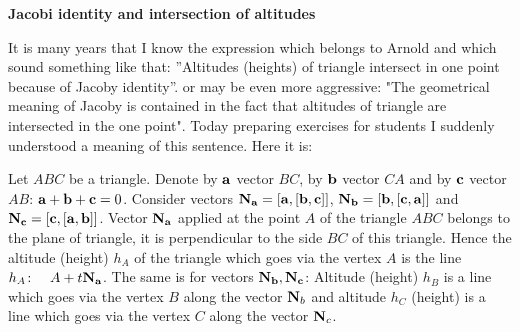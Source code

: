 \def\vare {\varepsilon}
\def\A {{\bf A}}
\def\t {\tilde}
\def\a {\alpha}
\def\K {{\bf K}}
\def\N {{\bf N}}
\def\V {{\cal V}}
\def\s {{\sigma}}
\def\S {{\Sigma}}
\def\s {{\sigma}}
\def\p{\partial}
\def\vare{{\varepsilon}}
\def\Q {{\bf Q}}
\def\D {{\cal D}}
\def\G {{\Gamma}}
\def\C {{\bf C}}
\def\M {{\cal M}}
\def\Z {{\bf Z}}
\def\U  {{\cal U}}
\def\H {{\cal H}}
\def\R  {{\bf R}}
\def\E  {{\bf E}}
\def\l {\lambda}
\def\degree {{\bf {\rm degree}\,\,}}
\def \finish {${\,\,\vrule height1mm depth2mm width 8pt}$}
\def \m {\medskip}
\def\p {\partial}
\def\r {{\bf r}}
\def\v {{\bf v}}
\def\n {{\bf n}}
\def\t {{\bf t}}
\def\b {{\bf b}}
\def\c {{\bf c }}
\def\e{{\bf e}}
\def\ac {{\bf a}}
\def \X   {{\bf X}}
\def \Y   {{\bf Y}}
\def \x   {{\bf x}}
\def \y   {{\bf y}}

\centerline  {\bf  Jacobi identity and intersection of altitudes}

\bigskip

  It is many years that I know the expression which belongs to Arnold and which sound something like
  that: ''Altitudes (heights) of triangle intersect in one point because of Jacoby identity''.
  or may be even more aggressive: "The geometrical meaning of Jacoby is contained in the fact that
    altitudes of triangle are intersected in the one point".
  Today preparing exercises for students I suddenly understood a meaning of this sentence. Here it is:

\m

  Let $ABC$ be a triangle. Denote by $\ac$ vector $BC$, by $\b$ vector $CA$ and by $\c$ vector $AB$:
  $\ac+\b+\c=0$.
   Consider vectors $\N_{\ac}=[\ac,[\b,\c]]$, $\N_{\b}=[\b,[\c,\ac]]$ and $\N_{\c}=[\c,[\ac,\b]]$.
   Vector $\N_{\ac}$ applied at the point $A$ of the triangle $ABC$ belongs to the plane of triangle, it
   is perpendicular to
   the side $BC$ of this triangle.  Hence the altitude (height) $h_A$ of the triangle
    which goes via the vertex $A$
   is the line $h_A\colon\quad A+t\N_{\ac}$. The same is for vectors $\N_\b,\N_\c$:
    Altitude (height) $h_B$ is a line which goes via the vertex $B$ along the vector $\N_b$ and
    altitude $h_C$ (height) is a line which goes via the vertex $C$ along the vector $\N_c$.

